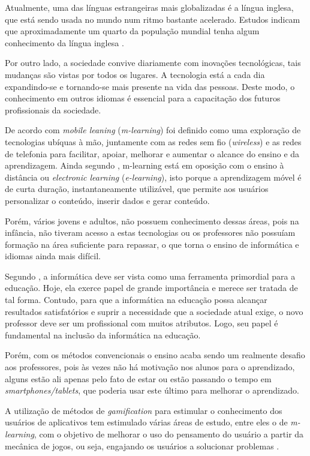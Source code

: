 \documentclass[
	12pt,				%
	openany,			%
	oneside,			%
	a4paper,			%
	english,			%
	french,				%
	spanish,			%
	brazil				%
	]{abntex2}
\begin{document}

Atualmente, uma das línguas estrangeiras mais globalizadas é a língua inglesa, que está sendo usada no mundo num ritmo bastante acelerado. Estudos indicam que  aproximadamente um quarto da população mundial tenha algum conhecimento da língua inglesa \cite{GRIGOLETTO}.

Por outro lado, a sociedade convive diariamente com inovações tecnológicas, tais mudanças são vistas por todos os lugares. A tecnologia está a cada dia expandindo-se e tornando-se mais presente na vida das pessoas. Deste modo, o conhecimento em outros idiomas é essencial para a capacitação dos futuros profissionais da sociedade.

De acordo com  \textit{mobile leaning} (\textit{m-learning}) foi definido como uma exploração de tecnologias ubíquas à mão, juntamente com as redes sem fio (\textit{wireless}) e as redes de telefonia para facilitar, apoiar, melhorar e aumentar o alcance do ensino e da aprendizagem. Ainda segundo , m-learning está em oposição com o ensino à distância ou \textit{electronic learning} (\textit{e-learning}), isto porque a aprendizagem móvel é de curta duração, instantaneamente utilizável, que permite aos usuários personalizar o conteúdo, inserir dados e gerar conteúdo.

Porém, vários jovens e adultos, não possuem conhecimento dessas áreas, pois na infância, não tiveram acesso a estas tecnologias ou os professores não possuíam formação na área suficiente para repassar, o que torna o ensino de informática e idiomas ainda mais difícil.

Segundo , a informática deve ser vista como uma ferramenta primordial para a educação. Hoje, ela exerce papel de grande importância e merece ser tratada de tal forma. Contudo, para que a informática na educação possa alcançar resultados satisfatórios e suprir a necessidade que a sociedade atual exige, o novo professor deve ser um profissional com muitos atributos. Logo, seu papel é fundamental na inclusão da informática na educação.

Porém, com os métodos convencionais o ensino acaba sendo um realmente desafio aos professores, pois às vezes não há motivação nos alunos para o aprendizado, alguns estão ali apenas pelo fato de estar ou estão passando o tempo em \textit{smartphones/tablets}, que poderia usar este último para melhorar o aprendizado.

A utilização de métodos de \textit{gamification} para estimular o conhecimento dos usuários de aplicativos tem estimulado várias áreas de estudo, entre eles o de \textit{m-learning}, com o objetivo de melhorar o uso do pensamento do usuário a partir da mecânica de jogos, ou seja, engajando os usuários a solucionar problemas \cite{LAW}.
 
\end{document}
